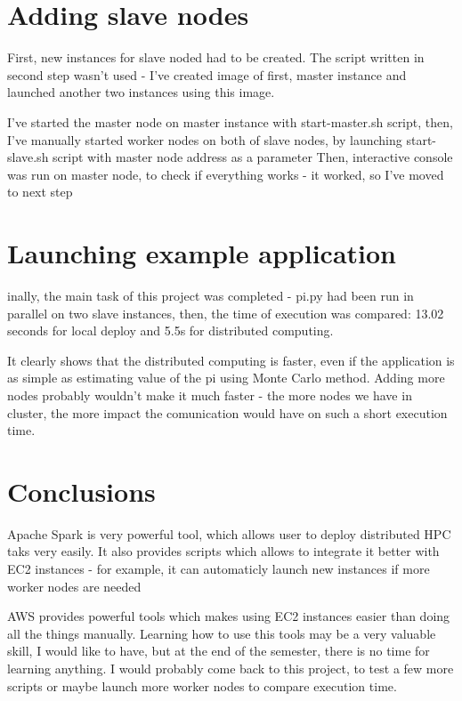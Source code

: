 \documentclass{article}
\begin{document}
\section{Adding slave nodes}
First, new instances for slave noded had to be created. The script written in second step wasn't used - I've created image of first, master instance and launched another two instances using this image. \par
I've started the master node on master instance with start-master.sh script, then, I've manually started worker nodes on both of slave nodes, by launching start-slave.sh script with master node address as a parameter
Then, interactive console was run on master node, to check if everything works - it worked, so I've moved to next step

\section{Launching example application}
inally, the main task of this project was completed - pi.py had been run in parallel on two slave instances, then, the time of execution was compared: 13.02 seconds for local deploy and 5.5s for distributed computing. \par
It clearly shows that the distributed computing is faster, even if the application is as simple as estimating value of the pi using Monte Carlo method. Adding more nodes probably wouldn't make it much faster - the more nodes we have in cluster, the more impact the comunication would have on such a short execution time.

\section{Conclusions}
Apache Spark is very powerful tool, which allows user to deploy distributed HPC taks very easily. It also provides scripts which allows to integrate it better with EC2 instances - for example, it can automaticly launch new instances if more worker nodes are needed \par
AWS provides powerful tools which makes using EC2 instances easier than doing all the things manually. Learning how to use this tools may be a very valuable skill, I would like to have, but at the end of the semester, there is no time for learning anything. \pa
I would probably come back to this project, to test a few more scripts or maybe launch more worker nodes to compare execution time.
\end{document}
